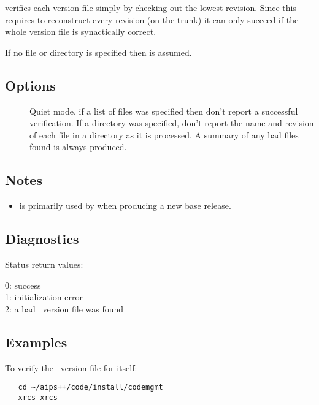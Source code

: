  verifies each version file simply by checking out the lowest
revision.  Since this requires  to reconstruct every revision (on
the trunk) it can only succeed if the whole version file is synactically
correct.

If no file or directory is specified then  is assumed.

\subsection*{Options}

\begin{description}
\item[]
   Quiet mode, if a list of files was specified then don't report a successful
   verification.  If a directory was specified, don't report the name and
   revision of each file in a directory as it is processed.  A summary of any
   bad files found is always produced.
\end{description}

\subsection*{Notes}
 
\begin{itemize}
\item
    is primarily used by  when producing a new base
   release.
\end{itemize}

\subsection*{Diagnostics}

Status return values:
\begin{status}
   0: success\\
   1: initialization error\\
   2: a bad \rcs\ version file was found
\end{status}

\subsection*{Examples}

To verify the \rcs\ version file for  itself:

\begin{verbatim}
   cd ~/aips++/code/install/codemgmt
   xrcs xrcs
\end{verbatim}

